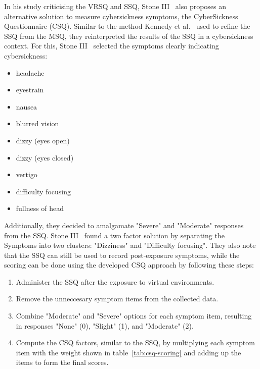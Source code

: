 In his study criticising the VRSQ and SSQ, Stone III~\cite{Stone2017} also proposes an alternative solution to
measure cybersickness symptoms, the CyberSickness Questionnaire (CSQ).
Similar to the method Kennedy et al.~\cite{Kennedy1993} used to refine the SSQ from the MSQ, they reinterpreted the
results of the SSQ in a cybersickness context.
For this, Stone III~\cite{Stone2017} selected the symptoms clearly indicating cybersickness:
\begin{itemize}
    \item headache
    \item eyestrain
    \item nausea
    \item blurred vision
    \item dizzy (eyes open)
    \item dizzy (eyes closed)
    \item vertigo
    \item difficulty focusing
    \item fullness of head
\end{itemize}
Additionally, they decided to amalgamate "Severe" and "Moderate" responses from the SSQ.
Stone III~\cite{Stone2017} found a two factor solution by separating the Symptoms into two clusters: "Dizziness" and
"Difficulty focusing".
They also note that the SSQ can still be used to record post-exposure symptoms, while the
scoring can be done using the developed CSQ approach by following these steps:
\begin{enumerate}
    \item Administer the SSQ after the exposure to virtual environments.
    \item Remove the unneccesary symptom items from the collected data.
    \item Combine "Moderate" and "Severe" options for each symptom item, resulting in responses "None" (0), "Slight"
    (1), and "Moderate" (2).
    \item Compute the CSQ factors, similar to the SSQ, by multiplying each symptom item with the weight shown in
    table~\ref{tab:csq-scoring} and adding up the items to form the final scores.
\end{enumerate}
